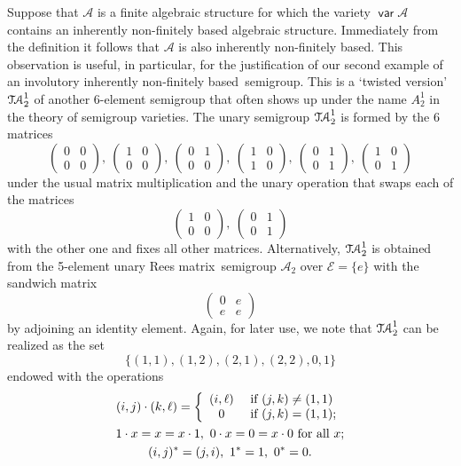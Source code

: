 \documentclass[11pt,reqno]{amsart}
\DeclareMathOperator{\var}{\mathsf{var}}
\numberwithin{equation}{section}
\theoremstyle{remark}
\def\Rm{Rees matrix}
\def\fb{finitely based}
\def\TA{\ensuremath{\mathcal{T\kern-1pt A}_2^1}}
\begin{document}
Suppose that $\mathcal{A}$ is a finite algebraic structure for
which the variety $\var\mathcal{A}$ contains an inherently
non-finitely based algebraic structure. Immediately from the
definition it follows that $\mathcal{A}$ is also inherently
non-\fb. This observation is useful, in particular, for the
justification of our second example of an involutory inherently
non-\fb\ semigroup. This is a `twisted version' $\TA$ of another
6-element semigroup that often shows up under the name $A_2^1$ in
the theory of semigroup varieties. The unary semigroup $\TA$ is
formed by the 6 matrices
$$\begin{pmatrix} 0 & 0\\ 0 & 0\end{pmatrix},\
\begin{pmatrix} 1 & 0\\ 0 & 0\end{pmatrix},\
\begin{pmatrix} 0 & 1\\ 0 & 0\end{pmatrix},\
\begin{pmatrix} 1 & 0\\ 1 & 0\end{pmatrix},\
\begin{pmatrix} 0 & 1\\ 0 & 1\end{pmatrix},\
\begin{pmatrix} 1 & 0\\ 0 & 1\end{pmatrix}$$
under the usual matrix multiplication and the unary operation that
swaps each of the matrices
$$\begin{pmatrix} 1 & 0\\ 0 & 0\end{pmatrix},\
\begin{pmatrix} 0 & 1\\ 0 & 1\end{pmatrix}$$
with the other one and fixes all other matrices. Alternatively,
$\TA$ is obtained from the 5-element unary \Rm\ semigroup
$\mathcal{A}_2$ over $\mathcal{E}=\{e\}$ with the sandwich matrix
\begin{equation}
\label{matrix for TA}
\begin{pmatrix}
0 & e\\
e & e
\end{pmatrix}
\end{equation}
by adjoining an identity element. Again, for later use, we note
that $\TA$ can be realized as the set
$$\{(1,1),(1,2),(2,1),(2,2),0,1\}$$ endowed with the operations
\begin{gather}
\label{operations in TA}
(i,j)\cdot(k,\ell)=\left\{\begin{array}{cl}
(i,\ell)&\ \text{if}\ (j,k)\ne (1,1)\\
0 &\ \text{if}\ (j,k)=(1,1);
\end{array}\right.\\
1\cdot x=x=x\cdot 1,\ 0\cdot x=0=x\cdot 0 \text{ for all }x; \notag\\
 (i,j)^* = (j,i),\ 1^*=1,\ 0^*=0\notag.
\end{gather}
\end{document}
